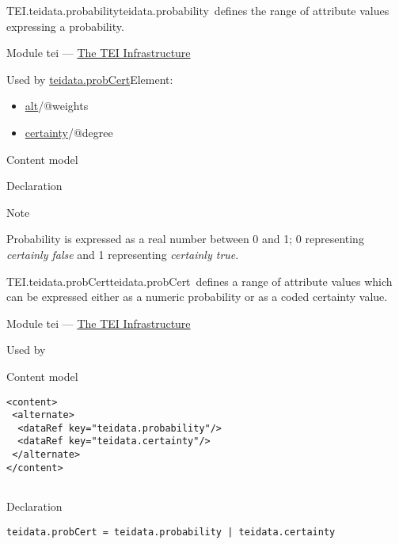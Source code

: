 \begin{reflist}
\item[]\begin{specHead}{TEI.teidata.probability}{teidata.probability} defines the range of attribute values expressing a probability.\end{specHead} 
    \item[{Module}]
  tei — \hyperref[ST]{The TEI Infrastructure}
    \item[{Used by}]
  \hyperref[TEI.teidata.probCert]{teidata.probCert}Element: \begin{itemize}
\item \hyperref[TEI.alt]{alt}/@weights
\item \hyperref[TEI.certainty]{certainty}/@degree
\end{itemize} 
    \item[{Content model}]
    \item[{Declaration}]
    \item[{Note}]
  \par
Probability is expressed as a real number between 0 and 1; 0 representing \textit{certainly false} and 1 representing \textit{certainly true}.
\end{reflist}  
\begin{reflist}
\item[]\begin{specHead}{TEI.teidata.probCert}{teidata.probCert} defines a range of attribute values which can be expressed either as a numeric probability or as a coded certainty value.\end{specHead} 
    \item[{Module}]
  tei — \hyperref[ST]{The TEI Infrastructure}
    \item[{Used by}]
  
    \item[{Content model}]
  \mbox{}\hfill\\[-10pt]\begin{Verbatim}[fontsize=\small]
<content>
 <alternate>
  <dataRef key="teidata.probability"/>
  <dataRef key="teidata.certainty"/>
 </alternate>
</content>
    
\end{Verbatim}

    \item[{Declaration}]
  \mbox{}\hfill\\[-10pt]\begin{Verbatim}[fontsize=\small]
teidata.probCert = teidata.probability | teidata.certainty
\end{Verbatim}

\end{reflist}  
